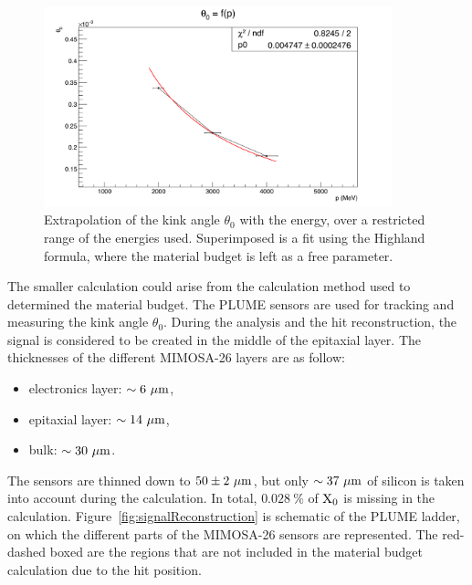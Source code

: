    \begin{figure}[!tbh]
     \centering
     \includegraphics[width = 0.9\textwidth]{Pictures/X0/theta0VsP_2-4GeV.png}
     \caption{Extrapolation of the kink angle $\theta_{0}$ with the energy, over a restricted range of the energies used.
     Superimposed is a fit using the Highland formula, where the material budget is left as a free parameter.}
     \label{fig:theta0vsP_2-4}
   \end{figure}

   The smaller calculation could arise from the calculation method used to determined the material budget.
   The \gls{PLUME} sensors are used for tracking and measuring the kink angle $\theta_{0}$.
   During the analysis and the hit reconstruction, the signal is considered to be created in the middle of the epitaxial layer.
   The thicknesses of the different \gls{MIMOSA}-26 layers are as follow:
   
   \begin{itemize}
     \item electronics layer: $\sim 6~\rm{\mu m}$,
     \item epitaxial layer: $\sim 14~\rm{\mu m}$,
     \item bulk: $\sim 30~\rm{\mu m}$.
   \end{itemize}

   The sensors are thinned down to $50 \pm 2~\rm{\mu m}$, but only $\sim 37~\rm{\mu m}$ of silicon is taken into account during the calculation.
   In total, $0.028~\%$ of $\rm{X_{0}}$ is missing in the calculation.
   Figure~\ref{fig:signalReconstruction} is schematic of the \gls{PLUME} ladder, on which the different parts of the \gls{MIMOSA}-26 sensors are represented.
   The red-dashed boxed are the regions that are not included in the material budget calculation due to the hit position.
   
